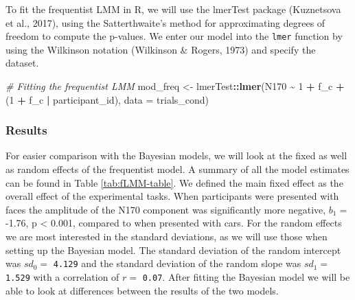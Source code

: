 \documentclass[
  doc,12pt,floatsintext]{apa7}
\newenvironment{Shaded}{\begin{snugshade}}{\end{snugshade}}
\newcommand{\AttributeTok}[1]{\textcolor[rgb]{0.13,0.29,0.53}{#1}}
\newcommand{\CommentTok}[1]{\textcolor[rgb]{0.56,0.35,0.01}{\textit{#1}}}
\newcommand{\DecValTok}[1]{\textcolor[rgb]{0.00,0.00,0.81}{#1}}
\newcommand{\FunctionTok}[1]{\textcolor[rgb]{0.13,0.29,0.53}{\textbf{#1}}}
\newcommand{\NormalTok}[1]{#1}
\newcommand{\OtherTok}[1]{\textcolor[rgb]{0.56,0.35,0.01}{#1}}
\newcommand{\SpecialCharTok}[1]{\textcolor[rgb]{0.81,0.36,0.00}{\textbf{#1}}}
\begin{document}
To fit the frequentist LMM in R, we will use the lmerTest package (Kuznetsova et al., 2017), using the Satterthwaite's method for approximating degrees of freedom to compute the p-values. We enter our model into the \texttt{lmer} function by using the Wilkinson notation (Wilkinson \& Rogers, 1973) and specify the dataset.

\begin{Shaded}
\begin{Highlighting}[]
\CommentTok{\# Fitting the frequentist LMM}
\NormalTok{mod\_freq }\OtherTok{\textless{}{-}}\NormalTok{ lmerTest}\SpecialCharTok{::}\FunctionTok{lmer}\NormalTok{(N170 }\SpecialCharTok{\textasciitilde{}} \DecValTok{1} \SpecialCharTok{+}\NormalTok{ f\_c }\SpecialCharTok{+}\NormalTok{ (}\DecValTok{1} \SpecialCharTok{+}\NormalTok{ f\_c }\SpecialCharTok{|}\NormalTok{ participant\_id), }
                           \AttributeTok{data =}\NormalTok{ trials\_cond)}
\end{Highlighting}
\end{Shaded}

\subsubsection{Results}\label{results}

For easier comparison with the Bayesian models, we will look at the fixed as well as random effects of the frequentist model. A summary of all the model estimates can be found in Table \ref{tab:fLMM-table}. We defined the main fixed effect as the overall effect of the experimental tasks. When participants were presented with faces the amplitude of the N170 component was significantly more negative, \(b_1 =\) -1.76, p \textless{} 0.001, compared to when presented with cars. For the random effects we are most interested in the standard deviations, as we will use those when setting up the Bayesian model. The standard deviation of the random intercept was \(sd_0 =\) \texttt{4.129} and the standard deviation of the random slope was \(sd_1 =\) \texttt{1.529} with a correlation of \(r =\) \texttt{0.07}. After fitting the Bayesian model we will be able to look at differences between the results of the two models.
\end{document}
